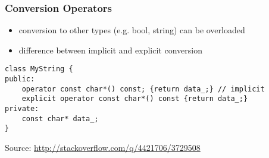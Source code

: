 \begin{frame}[fragile]
    \frametitle{Conversion Operators}
    \begin{itemize}
        \item conversion to other types (e.g. bool, string) can be overloaded
        \item difference between implicit and explicit conversion
    \end{itemize}
    \footnotesize
    \begin{lstlisting}[numbers=none]
class MyString {
public:
    operator const char*() const; {return data_;} // implicit
    explicit operator const char*() const {return data_;}
private:
    const char* data_;
}
    \end{lstlisting}
    Source: \href{http://stackoverflow.com/q/4421706/3729508}{http://stackoverflow.com/q/4421706/3729508}
\end{frame}


